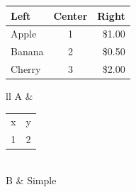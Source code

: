 \documentclass{article}
\begin{document}
\begin{tabular}{|l|c|r|}
\hline
Left   & Center & Right \\
\hline
Apple  & 1      & \$1.00 \\
Banana & 2      & \$0.50 \\
Cherry & 3      & \$2.00 \\
\hline
\end{tabular}

\vspace{1em}

\begin{tabular}{ll}
A & \begin{tabular}[t]{cc} x & y \\ 1 & 2 \end{tabular} \\
B & Simple                \\
\end{tabular}
\end{document}
